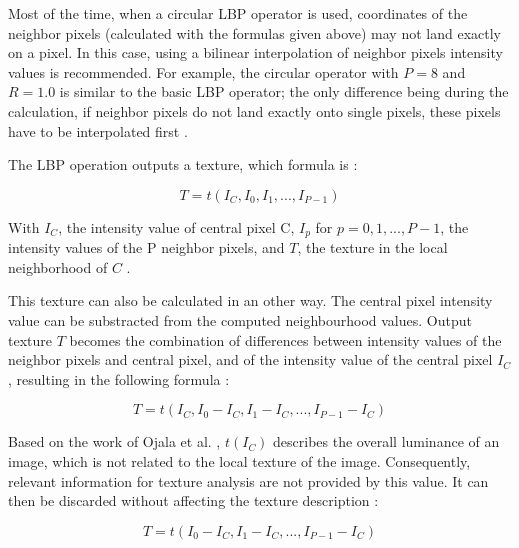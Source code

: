 \noindent Most of the time, when a circular LBP operator is used, coordinates of the neighbor pixels (calculated with the formulas given above) may not land exactly on a pixel. In this case, using a bilinear interpolation of neighbor pixels intensity values is recommended. For example, the circular operator with $ P = 8 $ and $ R = 1.0 $ is similar to the basic LBP operator; the only difference being during the calculation, if neighbor pixels do not land exactly onto single pixels, these pixels have to be interpolated first \cite{GAN08}.
\newline

\noindent The LBP operation outputs a texture, which formula is \cite{GAN08}:
\newline

\begin{equation}
   T = t(I_C, I_0, I_1, ..., I_{P-1})
\end{equation}

\vspace{\baselineskip}
\noindent With $ I_C $, the intensity value of central pixel C, $ I_p $ for $ p = 0, 1, ..., P-1 $, the intensity values of the P neighbor pixels, and $ T $, the texture in the local neighborhood of $ C $ \cite{GAN08}.
\newline

\noindent This texture can also be calculated in an other way. The central pixel intensity value can be substracted from the computed neighbourhood values. Output texture $ T $ becomes the combination of differences between intensity values of the neighbor pixels and central pixel, and of the intensity value of the central pixel $ I_C $, resulting in the following formula \cite{GAN08}:
\newline

\begin{equation}
   T = t(I_C, I_0 - I_C, I_1 - I_C, ..., I_{P-1} - I_C)
\end{equation}

\vspace{\baselineskip}
\noindent Based on the work of Ojala et al. \cite{OJA96}, $ t(I_C) $ describes the overall luminance of an image, which is not related to the local texture of the image. Consequently, relevant information for texture analysis are not provided by this value. It can then be discarded without affecting the texture description \cite{GAN08}:
\newline

\begin{equation}
   T = t(I_0 - I_C, I_1 - I_C, ..., I_{P-1} - I_C)
\end{equation}

